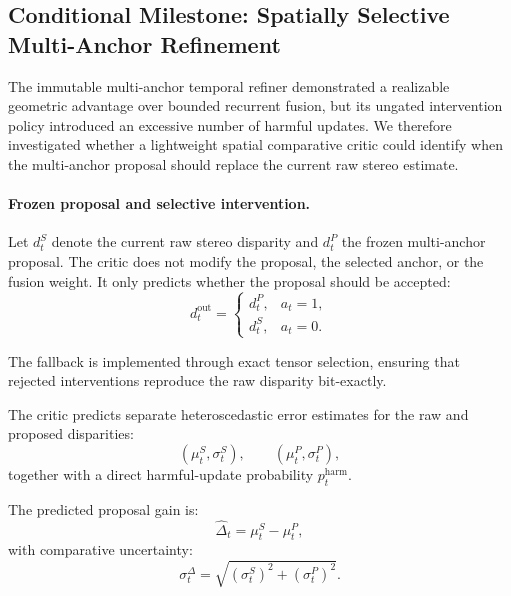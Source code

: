 \documentclass[11pt,a4paper]{article}
\begin{document}
\subsection{Conditional Milestone: Spatially Selective Multi-Anchor Refinement}
\label{sec:spatial_safety_critic}

The immutable multi-anchor temporal refiner demonstrated a realizable geometric
advantage over bounded recurrent fusion, but its ungated intervention policy
introduced an excessive number of harmful updates. We therefore investigated
whether a lightweight spatial comparative critic could identify when the
multi-anchor proposal should replace the current raw stereo estimate.

\paragraph{Frozen proposal and selective intervention.}

Let \(d_t^{S}\) denote the current raw stereo disparity and
\(d_t^{P}\) the frozen multi-anchor proposal. The critic does not modify the
proposal, the selected anchor, or the fusion weight. It only predicts whether
the proposal should be accepted:
\begin{equation}
    d_t^{\mathrm{out}}
    =
    \begin{cases}
        d_t^{P}, & a_t = 1,\\
        d_t^{S}, & a_t = 0.
    \end{cases}
\end{equation}

The fallback is implemented through exact tensor selection, ensuring that
rejected interventions reproduce the raw disparity bit-exactly.

The critic predicts separate heteroscedastic error estimates for the raw and
proposed disparities:
\begin{equation}
    \left(\mu_t^{S}, \sigma_t^{S}\right),
    \qquad
    \left(\mu_t^{P}, \sigma_t^{P}\right),
\end{equation}
together with a direct harmful-update probability \(p_t^{\mathrm{harm}}\).

The predicted proposal gain is:
\begin{equation}
    \widehat{\Delta}_t
    =
    \mu_t^{S}-\mu_t^{P},
\end{equation}
with comparative uncertainty:
\begin{equation}
    \sigma_t^{\Delta}
    =
    \sqrt{
        \left(\sigma_t^{S}\right)^2+
        \left(\sigma_t^{P}\right)^2
    }.
\end{equation}
\end{document}
